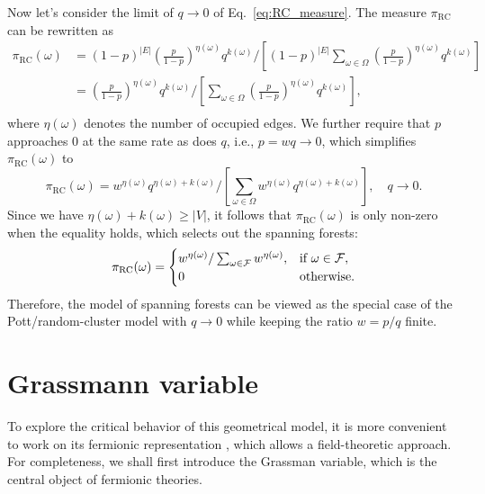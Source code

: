 Now let's consider the limit of $q\to 0$ of Eq.~\eqref{eq:RC_measure}. The measure $\pi_{\text{RC}}$ can be rewritten as
\begin{equation}
	\begin{aligned}
	\pi_{\text{RC}}(\omega) &= (1-p)^{|E|}(\frac{p}{1-p})^{\eta(\omega)}q^{k(\omega)}\Bigg/\left[(1-p)^{|E|}\sum_{\omega \in \Omega}(\frac{p}{1-p})^{\eta(\omega)}q^{k(\omega)}\right]\\
	&= (\frac{p}{1-p})^{\eta(\omega)}q^{k(\omega)}\Bigg/\left[\sum_{\omega \in \Omega}(\frac{p}{1-p})^{\eta(\omega)}q^{k(\omega)}\right],\\
	\end{aligned}
\end{equation}
where $\eta(\omega)$ denotes the number of occupied edges. We further require that $p$ approaches 0 at the same rate as does $q$, i.e., $p = w q \to 0$, which simplifies $\pi_{\text{RC}}(\omega)$ to
\begin{equation}
	\pi_{\text{RC}}(\omega) = w^{\eta(\omega)}q^{\eta(\omega) + k(\omega)}\Bigg/\left[\sum_{\omega \in \Omega}w^{\eta(\omega)}q^{\eta(\omega) + k(\omega)}\right], \quad q \to 0.
\end{equation}
Since we have $\eta(\omega) + k(\omega) \geq |V|$, it follows that $\pi_{\text{RC}}(\omega)$ is only non-zero
when the equality holds, which selects out the spanning forests:
\begin{equation}
	\pi_{\text{RC}}(\omega) =
	\begin{cases}
	 w^{\eta(\omega)}/\sum_{\omega \in {\mathcal F}}w^{\eta(\omega)}, &\text{if}\ \omega \in {\mathcal F}, \\
	 0 &\text{otherwise}.
	\end{cases}
\end{equation}
Therefore, the model of spanning forests can be viewed as the special case of the Pott/random-cluster model with 
$q \to 0$ while keeping the ratio $w = p/q$ finite. 

\section{Grassmann variable}
To explore the critical behavior of this geometrical model, it is more convenient to work on its fermionic representation \cite{Caracciolo2004}, 
which allows a field-theoretic approach. For completeness, we shall first introduce the Grassman variable, which is the central object
of fermionic theories. 

